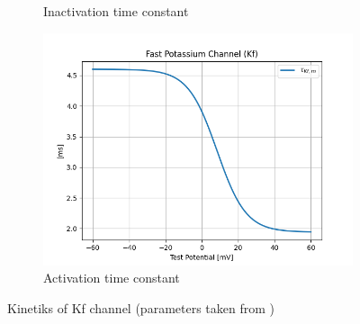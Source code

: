 \documentclass[11pt]{article}
\begin{document}
\begin{figure}[H]
\begin{subfigure}[t]{0.48\textwidth}
        \caption{Inactivation time constant}
        \label{fig_kf_inactivation_time_constant}
    \end{subfigure}
    \hfill
    \begin{subfigure}[t]{0.48\textwidth}
        \centering
        \includegraphics[width=\textwidth]{./img/2025_01_23/Kf_tau_m.png}
        \caption{Activation time constant}
        \label{fig_kf_activation_time_constant}
    \end{subfigure}

    \caption{Kinetiks of Kf channel (parameters taken from \parencite{gunayDistalSpikeInitiation2015})}
\end{figure}

\printbibliography
\end{document}
